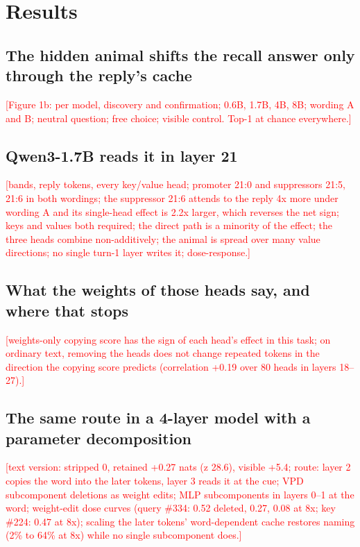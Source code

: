 \documentclass[11pt]{article}
\newcommand{\pending}[1]{\textcolor{red}{[#1]}}
\begin{document}
\section{Results}

\subsection{The hidden animal shifts the recall answer only through the reply's cache}
\pending{Figure 1b: per model, discovery and confirmation; 0.6B, 1.7B, 4B, 8B; wording A and B; neutral question;
free choice; visible control. Top-1 at chance everywhere.}

\subsection{Qwen3-1.7B reads it in layer 21}\label{sec:mech}
\pending{bands, reply tokens, every key/value head; promoter 21:0 and suppressors 21:5, 21:6 in both wordings; the
suppressor 21:6 attends to the reply 4x more under wording A and its single-head effect is 2.2x larger, which reverses
the net sign; keys and values both required; the direct path is a minority of the effect; the three heads combine
non-additively; the animal is spread over many value directions; no single turn-1 layer writes it; dose-response.}

\subsection{What the weights of those heads say, and where that stops}
\pending{weights-only copying score has the sign of each head's effect in this task; on ordinary text, removing the
heads does not change repeated tokens in the direction the copying score predicts (correlation +0.19 over 80 heads in
layers 18--27).}

\subsection{The same route in a 4-layer model with a parameter decomposition}
\pending{text version: stripped 0, retained +0.27 nats (z 28.6), visible +5.4; route: layer 2 copies the word into
the later tokens, layer 3 reads it at the cue; VPD subcomponent deletions as weight edits; MLP subcomponents in layers
0--1 at the word; weight-edit dose curves (query \#334: 0.52 deleted, 0.27, 0.08 at 8x; key \#224: 0.47 at 8x); scaling
the later tokens' word-dependent cache restores naming (2\% to 64\% at 8x) while no single subcomponent does.}
\end{document}
